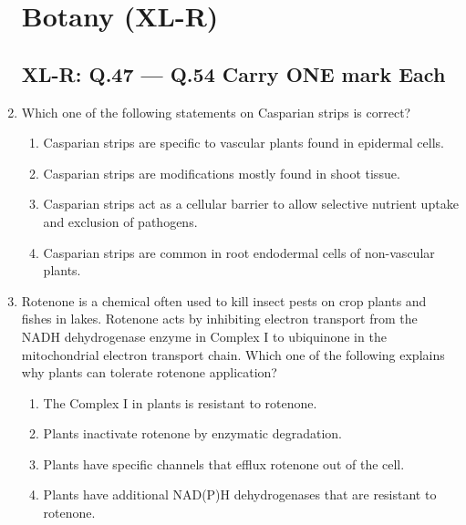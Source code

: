 \documentclass[journal,12pt,onecolumn]{IEEEtran}
\begin{document}
\begin{enumerate}
\section*{Botany (XL-R)}
\subsection*{XL-R: Q.47 --- Q.54 Carry ONE mark Each}

    \item Which one of the following statements on Casparian strips is correct?
    \begin{enumerate}
        \item Casparian strips are specific to vascular plants found in epidermal cells.
        \item Casparian strips are modifications mostly found in shoot tissue.
        \item Casparian strips act as a cellular barrier to allow selective nutrient uptake and exclusion of pathogens.
        \item Casparian strips are common in root endodermal cells of non-vascular plants.
    \end{enumerate}

    \item Rotenone is a chemical often used to kill insect pests on crop plants and fishes in lakes. Rotenone acts by inhibiting electron transport from the NADH dehydrogenase enzyme in Complex I to ubiquinone in the mitochondrial electron transport chain. Which one of the following explains why plants can tolerate rotenone application?
    \begin{enumerate}
        \item The Complex I in plants is resistant to rotenone.
        \item Plants inactivate rotenone by enzymatic degradation.
        \item Plants have specific channels that efflux rotenone out of the cell.
        \item Plants have additional NAD(P)H dehydrogenases that are resistant to rotenone.
    \end{enumerate}


\end{enumerate}
\end{document}
